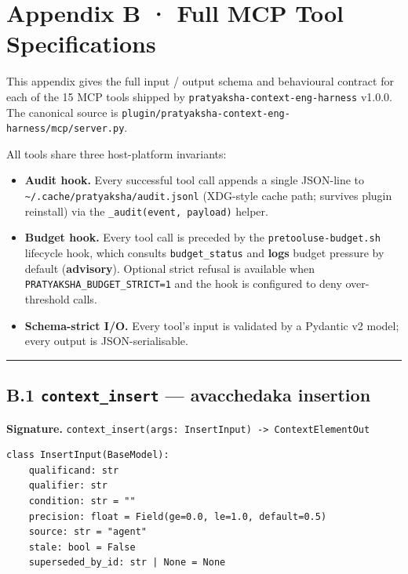\section{Appendix B · Full MCP Tool Specifications}\label{appendix-b-full-mcp-tool-specifications}

This appendix gives the full input / output schema and behavioural contract for each of the 15 MCP tools shipped by \texttt{pratyaksha-context-eng-harness} v1.0.0. The canonical source is \texttt{plugin/pratyaksha-context-eng-harness/mcp/server.py}.

All tools share three host-platform invariants:

\begin{itemize}
\tightlist
\item
  \textbf{Audit hook.} Every successful tool call appends a single JSON-line to \texttt{\textasciitilde{}/.cache/pratyaksha/audit.jsonl} (XDG-style cache path; survives plugin reinstall) via the \texttt{\_audit(event,\ payload)} helper.
\item
  \textbf{Budget hook.} Every tool call is preceded by the \texttt{pretooluse-budget.sh} lifecycle hook, which consults \texttt{budget\_status} and \textbf{logs} budget pressure by default (\textbf{advisory}). Optional strict refusal is available when \texttt{PRATYAKSHA\_BUDGET\_STRICT=1} and the hook is configured to deny over-threshold calls.
\item
  \textbf{Schema-strict I/O.} Every tool's input is validated by a Pydantic v2 model; every output is JSON-serialisable.
\end{itemize}

\begin{center}\rule{0.5\linewidth}{0.5pt}\end{center}

\subsection{\texorpdfstring{B.1 \texttt{context\_insert} --- avacchedaka insertion}{B.1 context\_insert --- avacchedaka insertion}}\label{b.1-context_insert-avacchedaka-insertion}

\textbf{Signature.} \texttt{context\_insert(args:\ InsertInput)\ -\textgreater{}\ ContextElementOut}

\begin{verbatim}
class InsertInput(BaseModel):
    qualificand: str
    qualifier: str
    condition: str = ""
    precision: float = Field(ge=0.0, le=1.0, default=0.5)
    source: str = "agent"
    stale: bool = False
    superseded_by_id: str | None = None
\end{verbatim}


